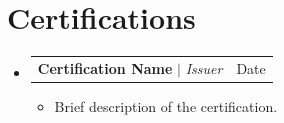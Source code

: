 \documentclass[letterpaper,11pt]{article}
\makeatletter
\newcommand{\resumeItem}[1]{
  \item\small{
    {#1 \vspace{-2pt}}
  }
}
\newcommand{\resumeProjectHeading}[2]{
    \item
    \begin{tabular*}{0.97\textwidth}{l@{\extracolsep{\fill}}r}
      \small#1 & #2 \\
    \end{tabular*}\vspace{-7pt}
}
\newcommand{\resumeSubHeadingListStart}{\begin{itemize}[leftmargin=0.15in, label={}]}
\newcommand{\resumeSubHeadingListEnd}{\end{itemize}}
\newcommand{\resumeItemListStart}{\begin{itemize}}
\newcommand{\resumeItemListEnd}{\end{itemize}\vspace{-5pt}}
\makeatother
\begin{document}
\section{\textcolor{blue(pigment)}{Certifications}}
  \resumeSubHeadingListStart
    \resumeProjectHeading
      {\textbf{Certification Name} $|$ \emph{Issuer}}{Date}
      \resumeItemListStart
        \resumeItem{Brief description of the certification.}
      \resumeItemListEnd
  \resumeSubHeadingListEnd
\end{document}
